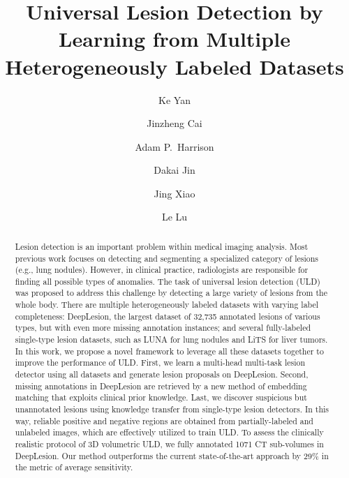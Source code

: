 \documentclass[runningheads]{llncs}
\def\eg{{e.g.}}
\begin{document}
\pagestyle{headings}
\mainmatter
\def\ECCVSubNumber{4369}  

\title{Universal Lesion Detection by Learning from Multiple Heterogeneously Labeled Datasets} \begin{comment}
\titlerunning{ECCV-20 submission ID \ECCVSubNumber} 
\authorrunning{ECCV-20 submission ID \ECCVSubNumber} 
\author{Anonymous ECCV submission}
\institute{Paper ID \ECCVSubNumber}
\end{comment}


\author{Ke Yan \and
Jinzheng Cai \and
Adam P.~Harrison \and
Dakai Jin \and
Jing Xiao \and
Le Lu}
\maketitle

\begin{abstract}
Lesion detection is an important problem within medical imaging analysis. Most previous work focuses on detecting and segmenting a specialized category of lesions (\eg, lung nodules). However, in clinical practice, radiologists are responsible for finding all possible types of anomalies. The task of universal lesion detection (ULD) was proposed to address this challenge by detecting a large variety of lesions from the whole body. There are multiple heterogeneously labeled datasets with varying label completeness: DeepLesion, the largest dataset of 32,735 annotated lesions of various types, but with even more missing annotation instances; and several fully-labeled single-type lesion datasets, such as LUNA for lung nodules and LiTS for liver tumors. In this work, we propose a novel framework to leverage all these datasets together to improve the performance of ULD. First, we learn a multi-head multi-task lesion detector using all datasets and generate lesion proposals on DeepLesion. Second, missing annotations in DeepLesion are retrieved by a new method of embedding matching that exploits clinical prior knowledge. Last, we discover suspicious but unannotated lesions using knowledge transfer from single-type lesion detectors. In this way, reliable positive and negative regions are obtained from partially-labeled and unlabeled images, which are effectively utilized to train ULD. To assess the clinically realistic protocol of 3D volumetric ULD, we fully annotated 1071 CT sub-volumes in DeepLesion. Our method outperforms the current state-of-the-art approach by 29\% in the metric of average sensitivity. 

\end{abstract}
\end{document}
